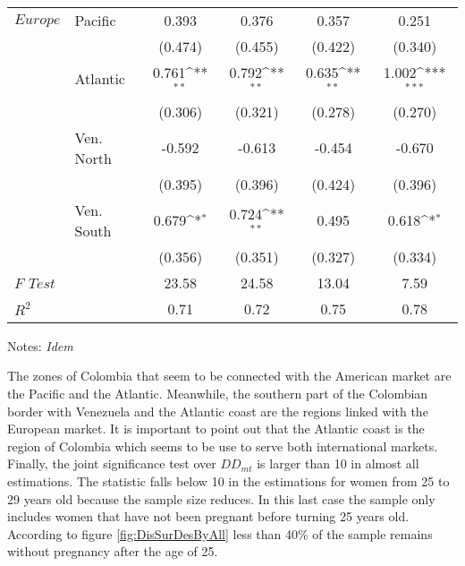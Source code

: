 \documentclass[a4paper,10pt,twocolumn,preprint,3p,authoryear]{elsarticle}
\def\sym#1{\ifmmode^{#1}\else\(^{#1}\)\fi}
\begin{document}
\begin{table}[h]
\begin{tabular}{llcccc}
$Europe$& Pacific	&       0.393         &	       0.376         &	       0.357         &	       0.251         \\
&	&     (0.474)         &	     (0.455)         &	     (0.422)         &	     (0.340)         \\
				
& Atlantic&       0.761\sym{**} &	       0.792\sym{**} &	       0.635\sym{**} &	       1.002\sym{***}\\
&	&     (0.306)         &	     (0.321)         &	     (0.278)         &	     (0.270)         \\
				
& Ven. North	&      -0.592         &	      -0.613         &	      -0.454         &	      -0.670         \\
&	&     (0.395)         &	     (0.396)         &	     (0.424)         &	     (0.396)         \\
				
& Ven. South&	      0.679\sym{*}  &	       0.724\sym{**} &	       0.495         &	       0.618\sym{*}  \\
&	&     (0.356)         &	     (0.351)         &	     (0.327)         &	     (0.334)         \\
\hline				
$F$ $Test$&	&       23.58         &	       24.58         &	       13.04         &	        7.59         \\
$R^{2}$&	&        0.71         &	        0.72         &	        0.75         &	        0.78         \\
\hline
	\end{tabular}
	\begin{minipage}[t]{1\columnwidth}%
		  \begin{spacing}{1}
		  \noindent 
		  {Notes: \emph{Idem}}
		  \end{spacing}
	  \end{minipage}
	\label{tab:preg2onhomRate_fsDD1020}
\end{table}

The zones of Colombia that seem to be connected with the American market are the Pacific and the Atlantic. Meanwhile, the southern part of the Colombian border with Venezuela and the Atlantic coast  are the regions linked with the European market. It is important to point out that the Atlantic coast is the region of Colombia which seems to be use to serve both international markets. Finally, the joint significance test over $DD_{mt}$ is larger than 10 in almost all estimations. The statistic falls below 10 in the estimations for women from 25 to 29 years old because the sample size reduces. In this last case the sample only includes women that have not been pregnant before turning 25 years old. According to figure \ref{fig:DisSurDesByAll} less than 40\% of the sample remains without pregnancy after the age of 25.    
\end{document}
